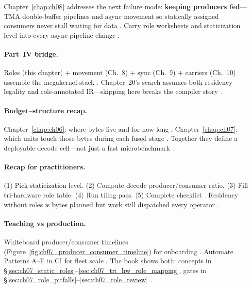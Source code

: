Chapter~\ref{chap:ch08} addresses the next failure mode: \textbf{keeping producers fed}---TMA double-buffer pipelines and async movement so statically assigned consumers never stall waiting for data \citep{semianalysis2024tma,dao2022flashattention}.
Carry role worksheets and staticization level into every async-pipeline change \citep{yirage2026,memoryfloor2026}.

\paragraph{Part~IV bridge.}
Roles (this chapter) + movement (Ch.~8) + sync (Ch.~9) + carriers (Ch.~10) assemble the megakernel stack \citep{dao2022flashattention,shah2024flashattention3,mpk2025}.
Chapter~20's search assumes both residency legality and role-annotated IR---skipping here breaks the compiler story \citep{wu2024mirage,yirage2026,chen2020compilerbasedhardw}.

\paragraph{Budget--structure recap.}
Chapter~\ref{chap:ch06}: where bytes live and for how long \citep{dao2022flashattention,yirage2026,chen2020compilerbasedhardw}.
Chapter~\ref{chap:ch07}: which units touch those bytes during each fused stage \citep{shah2024flashattention3,mpk2025,patel2025llminference}.
Together they define a deployable decode cell---not just a fast microbenchmark \citep{taxbreak2026,memoryfloor2026}.

\paragraph{Recap for practitioners.}
(1) Pick staticization level. (2) Compute decode producer/consumer ratio. (3) Fill tri-hardware role table. (4) Run tiling pass. (5) Complete checklist \citep{taxbreak2026,shah2024flashattention3,yirage2026,patel2025llminference,mpk2025,amd2024xdna,nvidia2022hopper,semianalysis2024tma,dao2022flashattention,memoryfloor2026,wu2024mirage,nvidia2024cudagraphs,kwon2023vllm,dlbook,chen2020compilerbasedhardw}.
Residency without roles is bytes planned but work still dispatched every operator \citep{taxbreak2026,memoryfloor2026}.

\paragraph{Teaching vs production.}
Whiteboard producer/consumer timelines (Figure~\ref{fig:ch07_producer_consumer_timeline}) for onboarding \citep{shah2024flashattention3,dlbook}.
Automate Patterns A--E in CI for fleet scale \citep{yirage2026,patel2025llminference,mpk2025}.
The book shows both: concepts in \S\ref{sec:ch07_static_roles}--\ref{sec:ch07_tri_hw_role_mapping}, gates in \S\ref{sec:ch07_role_pitfalls}--\ref{sec:ch07_role_review} \citep{chen2020compilerbasedhardw,taxbreak2026}.

